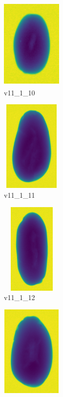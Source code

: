 \documentclass[11pt]{article}
\begin{document}
\begin{figure}
          \begin{subfigure}[b]{0.15\textwidth}
         \centering
         \includegraphics[width=3cm, height=4.5cm]{images/kartofler/v11_1_10_cut.png}
         \caption{v11\_1\_10}
         \label{fig:y equals x}
     \end{subfigure}
     \hfill
     \begin{subfigure}[b]{0.15\textwidth}
         \centering
         \includegraphics[width=3cm, height=4.5cm]{images/kartofler/v11_1_11_cut.png}
        \caption{v11\_1\_11}
         \label{fig:three sin x}
     \end{subfigure}
     \hfill
     \begin{subfigure}[b]{0.15\textwidth}
         \centering
         \includegraphics[width=3cm, height=4.5cm]{images/kartofler/v11_1_12_cut.png}
        \caption{v11\_1\_12}
         \label{fig:five over x}
     \end{subfigure}
     \hfill
    \begin{subfigure}[b]{0.15\textwidth}
         \centering
         \includegraphics[width=3cm, height=4.5cm]{images/kartofler/v11_1_13_cut.png}

\end{subfigure}
\end{figure}
\end{document}
